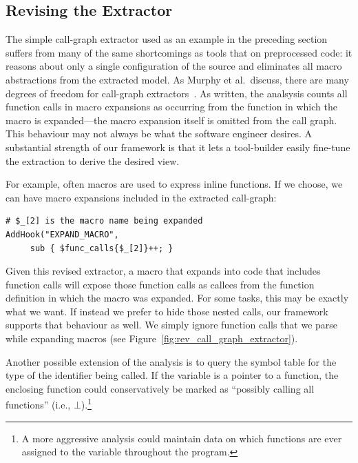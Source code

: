 \documentclass{article}
\newcommand{\ie}{i.e.,}
\begin{document}
\subsection{Revising the Extractor}
\label{sec:call_graph_revised}
The simple call-graph extractor used as an example in the preceding
section suffers from many of the same shortcomings as tools that
 on preprocessed code: it reasons about only a single
configuration of the source and eliminates all macro abstractions
from the extracted model.  As Murphy et al.\ discuss, there are many
degrees of freedom for call-graph extractors~\cite{Murphy98}.  As
written, the analsysis counts all function calls in macro expansions as
occurring from the function in which the macro is expanded---the macro
expansion itself is omitted from the call graph.  This behaviour may not 
always be what the software engineer desires. A substantial
strength of our framework is that it lets a tool-builder easily
fine-tune the extraction to derive the desired view.

For example, often macros are used to express inline functions.  If we
choose, we can have macro expansions included in the extracted
call-graph:

\begin{verbatim}
# $_[2] is the macro name being expanded
AddHook("EXPAND_MACRO", 
     sub { $func_calls{$_[2]}++; }
\end{verbatim}

\noindent Given this revised extractor, a macro that expands into code
that includes function calls will expose those function calls as callees
from the function definition in which the macro was expanded.  For some
tasks, this may be exactly what we want.  If instead we prefer to hide
those nested calls, our framework supports that behaviour as well.  We
simply ignore function calls that we parse while expanding macros (see
Figure~\ref{fig:rev_call_graph_extractor}).

Another possible extension of the analysis is to query the symbol table
for the type of the identifier being called.  If the variable is a
pointer to a function, the enclosing function could conservatively be
marked as ``possibly calling all functions'' (\ie{} $\bot$).\footnote{A more
aggressive analysis could maintain data on which functions
are ever assigned to the variable throughout the program.}
\end{document}
